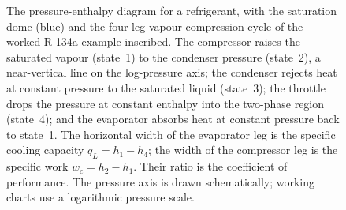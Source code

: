 \begin{figure}[htbp]
\caption[Pressure-enthalpy diagram of a vapour-compression cycle]{The
pressure-enthalpy diagram for a refrigerant, with the saturation dome
(blue) and the four-leg vapour-compression cycle of the worked R-134a
example inscribed. The compressor raises the saturated vapour (state~1)
to the condenser pressure (state~2), a near-vertical line on the
log-pressure axis; the condenser rejects heat at constant pressure to the
saturated liquid (state~3); the throttle drops the pressure at constant
enthalpy into the two-phase region (state~4); and the evaporator absorbs
heat at constant pressure back to state~1. The horizontal width of the
evaporator leg is the specific cooling capacity $q_L=h_1-h_4$; the width
of the compressor leg is the specific work $w_c=h_2-h_1$. Their ratio is
the coefficient of performance. The pressure axis is drawn schematically;
working charts use a logarithmic pressure scale.}
\label{fig:vol04ch02:ph-refrigerant-cycle}
\end{figure}

